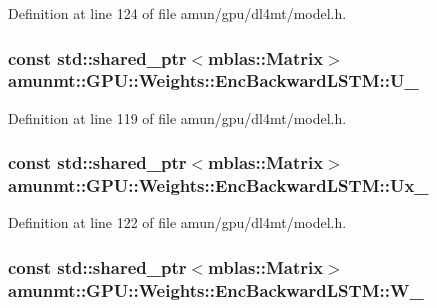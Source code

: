 Definition at line 124 of file amun/gpu/dl4mt/model.\+h.

\subsubsection[{\texorpdfstring{U\+\_\+}{U_}}]{\setlength{\rightskip}{0pt plus 5cm}const std\+::shared\+\_\+ptr$<${\bf mblas\+::\+Matrix}$>$ amunmt\+::\+G\+P\+U\+::\+Weights\+::\+Enc\+Backward\+L\+S\+T\+M\+::\+U\+\_\+}\hypertarget{structamunmt_1_1GPU_1_1Weights_1_1EncBackwardLSTM_a499c1d7edd9716113ae5882572c890f1}{}\label{structamunmt_1_1GPU_1_1Weights_1_1EncBackwardLSTM_a499c1d7edd9716113ae5882572c890f1}


Definition at line 119 of file amun/gpu/dl4mt/model.\+h.

\subsubsection[{\texorpdfstring{Ux\+\_\+}{Ux_}}]{\setlength{\rightskip}{0pt plus 5cm}const std\+::shared\+\_\+ptr$<${\bf mblas\+::\+Matrix}$>$ amunmt\+::\+G\+P\+U\+::\+Weights\+::\+Enc\+Backward\+L\+S\+T\+M\+::\+Ux\+\_\+}\hypertarget{structamunmt_1_1GPU_1_1Weights_1_1EncBackwardLSTM_aae6804c97e2a3fce8e28647b5de85ebf}{}\label{structamunmt_1_1GPU_1_1Weights_1_1EncBackwardLSTM_aae6804c97e2a3fce8e28647b5de85ebf}


Definition at line 122 of file amun/gpu/dl4mt/model.\+h.

\subsubsection[{\texorpdfstring{W\+\_\+}{W_}}]{\setlength{\rightskip}{0pt plus 5cm}const std\+::shared\+\_\+ptr$<${\bf mblas\+::\+Matrix}$>$ amunmt\+::\+G\+P\+U\+::\+Weights\+::\+Enc\+Backward\+L\+S\+T\+M\+::\+W\+\_\+}\hypertarget{structamunmt_1_1GPU_1_1Weights_1_1EncBackwardLSTM_a6b6646ecfb242949e0ee5d0a0d3a60b4}{}\label{structamunmt_1_1GPU_1_1Weights_1_1EncBackwardLSTM_a6b6646ecfb242949e0ee5d0a0d3a60b4}


